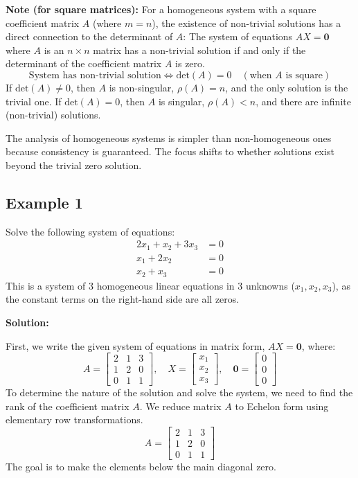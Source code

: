 \documentclass{article}
\begin{document}
\textbf{Note (for square matrices):}
For a homogeneous system with a square coefficient matrix $A$ (where $m=n$), the existence of non-trivial solutions has a direct connection to the determinant of $A$:
The system of equations $AX=\mathbf{0}$ where $A$ is an $n \times n$ matrix has a non-trivial solution if and only if the determinant of the coefficient matrix $A$ is zero.
\[ \text{System has non-trivial solution} \iff \text{det}(A) = 0 \quad (\text{when } A \text{ is square}) \]
If $\text{det}(A) \neq 0$, then $A$ is non-singular, $\rho(A) = n$, and the only solution is the trivial one.
If $\text{det}(A) = 0$, then $A$ is singular, $\rho(A) < n$, and there are infinite (non-trivial) solutions.

The analysis of homogeneous systems is simpler than non-homogeneous ones because consistency is guaranteed. The focus shifts to whether solutions exist beyond the trivial zero solution.

\subsection{Example 1} %
Solve the following system of equations:
\begin{align*} 2x_1 + x_2 + 3x_3 &= 0 \\ x_1 + 2x_2 \quad &= 0 \\ x_2 + x_3 &= 0 \end{align*}
This is a system of 3 homogeneous linear equations in 3 unknowns ($x_1, x_2, x_3$), as the constant terms on the right-hand side are all zeros.

\textbf{Solution:}

First, we write the given system of equations in matrix form, $AX = \mathbf{0}$, where:
\[ A = \begin{bmatrix} 2 & 1 & 3 \\ 1 & 2 & 0 \\ 0 & 1 & 1 \end{bmatrix}, \quad X = \begin{bmatrix} x_1 \\ x_2 \\ x_3 \end{bmatrix}, \quad \mathbf{0} = \begin{bmatrix} 0 \\ 0 \\ 0 \end{bmatrix} \]
To determine the nature of the solution and solve the system, we need to find the rank of the coefficient matrix $A$. We reduce matrix $A$ to Echelon form using elementary row transformations.
\[ A = \begin{bmatrix} 2 & 1 & 3 \\ 1 & 2 & 0 \\ 0 & 1 & 1 \end{bmatrix} \]
The goal is to make the elements below the main diagonal zero.
\end{document}
